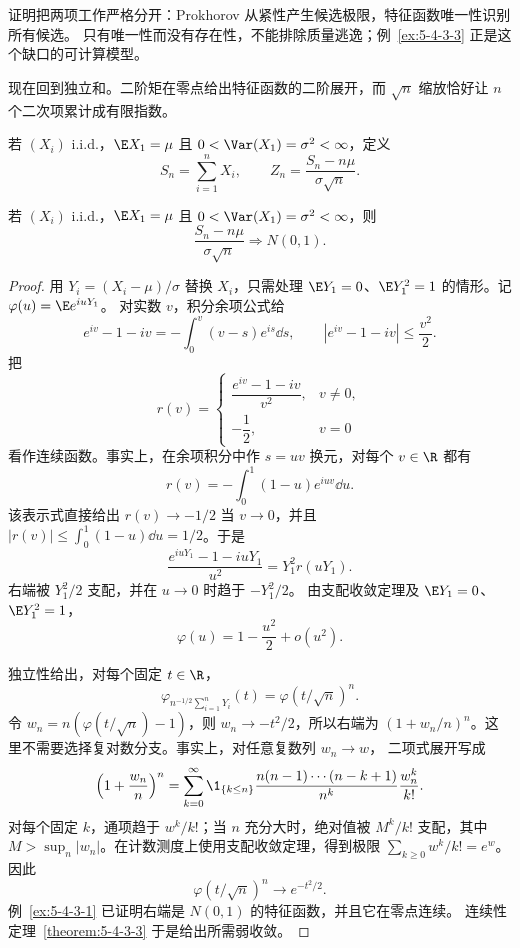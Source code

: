 证明把两项工作严格分开：Prokhorov 从紧性产生候选极限，特征函数唯一性识别所有候选。
只有唯一性而没有存在性，不能排除质量逃逸；例~\ref{ex:5-4-3-3} 正是这个缺口的可计算模型。

现在回到独立和。二阶矩在零点给出特征函数的二阶展开，而 $\sqrt n$ 缩放恰好让
$n$ 个二次项累计成有限指数。

\begin{definition}[标准化和]\label{def:5-4-3-3}
若 $(X_i)$ i.i.d.，$\E X_1=\mu$ 且
$0<\Var(X_1)=\sigma^2<\infty$，定义
\[
 S_n=\sum_{i=1}^nX_i,
 \qquad
 Z_n=\frac{S_n-n\mu}{\sigma\sqrt n}.
\]
\end{definition}

\begin{theorem}\label{theorem:5-4-3-4}
若 $(X_i)$ i.i.d.，$\E X_1=\mu$ 且
$0<\Var(X_1)=\sigma^2<\infty$，则
\[
 \frac{S_n-n\mu}{\sigma\sqrt n}\Rightarrow N(0,1).
\]
\end{theorem}

\begin{proof}
用 $Y_i=(X_i-\mu)/\sigma$ 替换 $X_i$，只需处理
$\E Y_1=0$、$\E Y_1^2=1$ 的情形。记 $\varphi(u)=\E e^{iuY_1}$。
对实数 $v$，积分余项公式给
\[
 e^{iv}-1-iv=-\int_0^v(v-s)e^{is}\dd s,
 \qquad
 |e^{iv}-1-iv|\leq\frac{v^2}{2}.
\]
把
\[
 r(v)=
 \begin{cases}
 \dfrac{e^{iv}-1-iv}{v^2},&v\ne0,\\[5pt]
 -\dfrac12,&v=0
 \end{cases}
\]
看作连续函数。事实上，在余项积分中作 $s=uv$ 换元，对每个 $v\in\R$ 都有
\[
 r(v)=-\int_0^1(1-u)e^{iuv}\dd u.
\]
该表示式直接给出 $r(v)\to-1/2$ 当 $v\to0$，并且
$|r(v)|\le\int_0^1(1-u)\dd u=1/2$。于是
\[
 \frac{e^{iuY_1}-1-iuY_1}{u^2}=Y_1^2r(uY_1).
\]
右端被 $Y_1^2/2$ 支配，并在 $u\to0$ 时趋于 $-Y_1^2/2$。
由支配收敛定理及 $\E Y_1=0$、$\E Y_1^2=1$，
\[
 \varphi(u)=1-\frac{u^2}{2}+o(u^2).
\]

独立性给出，对每个固定 $t\in\R$，
\[
 \varphi_{n^{-1/2}\sum_{i=1}^nY_i}(t)
 =\varphi(t/\sqrt n)^n.
\]
令 $w_n=n(\varphi(t/\sqrt n)-1)$，则 $w_n\to-t^2/2$，所以右端为
$(1+w_n/n)^n$。这里不需要选择复对数分支。事实上，对任意复数列 $w_n\to w$，
二项式展开写成
\[
 \left(1+\frac{w_n}{n}\right)^n
 =\sum_{k=0}^{\infty}
 \1_{\{k\leq n\}}\frac{n(n-1)\cdots(n-k+1)}{n^k}
 \frac{w_n^k}{k!}.
\]
对每个固定 $k$，通项趋于 $w^k/k!$；当 $n$ 充分大时，绝对值被
$M^k/k!$ 支配，其中 $M>\sup_n|w_n|$。在计数测度上使用支配收敛定理，得到极限
$\sum_{k\geq0}w^k/k!=e^w$。因此
\[
 \varphi(t/\sqrt n)^n\longrightarrow e^{-t^2/2}.
\]
例~\ref{ex:5-4-3-1} 已证明右端是 $N(0,1)$ 的特征函数，并且它在零点连续。
\Levy{} 连续性定理~\ref{theorem:5-4-3-3} 于是给出所需弱收敛。
\end{proof}

